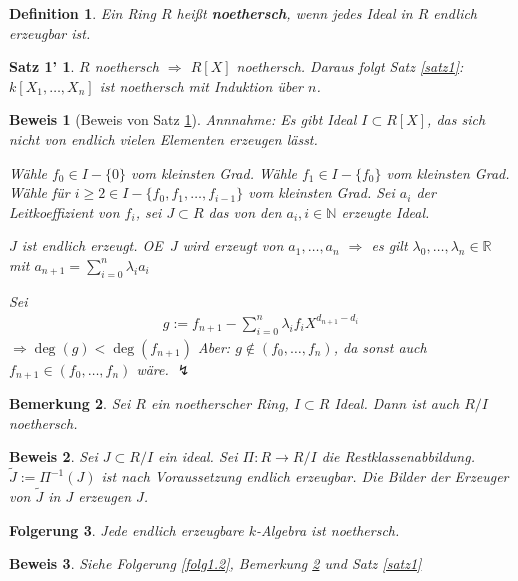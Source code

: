 \documentclass[a4paper, 12pt, numbers=noendperiod, chapterprefix=true]{scrbook}
\theoremstyle{break}
\newtheorem{Def}{Definition}[section]
\newtheorem{Bem}[Def]{Bemerkung}
\newtheorem{Folg}[Def]{Folgerung}
\theoremstyle{nonumberbreak}
\newtheorem{nnSatz1}{Satz 1'} %
\newtheorem{Bew}{Beweis}
\theoremstyle{nonumberplain}
\newcommand{\emp}[1]{\textbf{\emph{#1}}}
\newcommand{\defterm}[1]{{\index{#1}}\emp{#1}}
\newcommand{\R}{\mathbb{R}}
\newcommand{\N}{\mathbb{N}}
\renewcommand{\OE}{O\!\!E~}
\begin{document}
\begin{Def}
Ein Ring $R$ hei\ss t \defterm{noethersch}, wenn jedes Ideal in $R$ endlich erzeugbar ist.
\end{Def}

\begin{nnSatz1}\label{satz1'}
$R$ noethersch $\Rightarrow$ $R[X]$ noethersch. Daraus folgt Satz \ref{satz1}: $k[X_1,\dots ,X_n]$ ist noethersch mit Induktion \"uber $n$.
\end{nnSatz1}

\begin{Bew}[Beweis von Satz \ref{satz1'}]
\emph{Annnahme:} Es gibt Ideal $I\subset R[X]$, das sich nicht von endlich vielen Elementen erzeugen l\"asst.

W\"ahle $f_0 \in I-\{0\}$ vom kleinsten Grad. W\"ahle $f_1 \in I-\{f_0\}$ vom kleinsten Grad. W\"ahle f\"ur $i\ge2\in I-\{f_0,f_1,\dots ,f_{i-1}\}$ vom kleinsten Grad. Sei $a_i$ der Leitkoeffizient von $f_i$, sei $J\subset R$ das von den $a_i,i\in \N$ erzeugte Ideal.

$J$ ist endlich erzeugt. \OE $J$ wird erzeugt von $a_1,\dots ,a_n$ $\Rightarrow$ es gilt $\lambda_0,\dots ,\lambda_n \in \R$ mit $a_{n+1}=\sum_{i=0}^n\lambda_i a_i$

Sei \begin{align*}g:= f_{n+1}-\sum_{i=0}^n \lambda_i f_i X^{d_{n+1}-d_i}\end{align*} $\Rightarrow \deg(g) <\deg(f_{n+1})$ \emph{Aber}: $g\notin (f_0,\dots ,f_n)$, da sonst auch $f_{n+1} \in(f_0,\dots ,f_n)$ w\"are. $\lightning$
\end{Bew}

\begin{Bem}\label{bem1.8}
Sei $R$ ein noetherscher Ring, $I\subset R$ Ideal. Dann ist auch $R/I$ noethersch.
\end{Bem}

\begin{Bew}
Sei $J \subset R/I$ ein ideal. Sei $\Pi:R \to R/I$ die Restklassenabbildung. $\tilde{J} := \Pi^{-1}(J)$ ist nach Voraussetzung endlich erzeugbar. Die Bilder der Erzeuger von $\tilde{J}$ in $J$ erzeugen $J$.
\end{Bew}

\begin{Folg}
Jede endlich erzeugbare $k$-Algebra ist noethersch.
\end{Folg}

\begin{Bew}
Siehe Folgerung \ref{folg1.2}, Bemerkung \ref{bem1.8} und Satz \ref{satz1}
\end{Bew}
\end{document}
